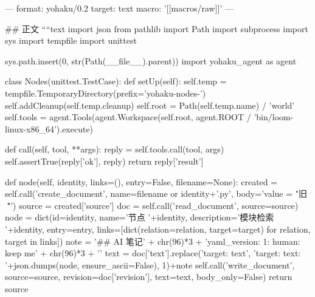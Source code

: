---
format: yohaku/0.2
target: text
macro: '[[macros/raw]]'
---

## 正文
````text
import json
from pathlib import Path
import subprocess
import sys
import tempfile
import unittest

sys.path.insert(0, str(Path(__file__).parent))
import yohaku_agent as agent


class Nodes(unittest.TestCase):
    def setUp(self):
        self.temp = tempfile.TemporaryDirectory(prefix='yohaku-nodes-')
        self.addCleanup(self.temp.cleanup)
        self.root = Path(self.temp.name) / 'world'
        self.tools = agent.Tools(agent.Workspace(self.root, agent.ROOT / 'bin/loom-linux-x86_64').execute)

    def call(self, tool, **args):
        reply = self.tools.call(tool, args)
        self.assertTrue(reply['ok'], reply)
        return reply['result']

    def node(self, identity, links=(), entry=False, filename=None):
        created = self.call('create_document', name=filename or identity+'.py', body='value = "旧 🧸"\r\n')
        source = created['source']
        doc = self.call('read_document', source=source)
        node = dict(id=identity, name='节点 '+identity, description='模块检索 '+identity, entry=entry,
                    links=[dict(relation=relation, target=target) for relation, target in links])
        note = '\n## AI 笔记\n' + chr(96)*3 + 'yaml\nsource_version: 1\nwriter: human\nsummary: keep me\n' + chr(96)*3 + '\n'
        text = doc['text'].replace('target: text', 'target: text\nnode: '+json.dumps(node, ensure_ascii=False), 1)+note
        self.call('write_document', source=source, revision=doc['revision'], text=text, body_only=False)
        return source


